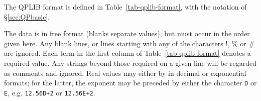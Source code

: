 
The QPLIB format is defined in Table~\ref{tab-qplib-format}, with the notation of \S\ref{sec:QPbasic}.

The data is in free format (blanks separate values), but must occur in
the order given here. Any blank lines, or lines starting with any of the
characters !, \% or \# are ignored. Each term in the first column of
Table~\ref{tab-qplib-format} denotes a required value. Any strings beyond
those required on a given line will be regarded as comments and ignored.
Real values may either by in decimal or exponential formats; for the latter,
the exponent may be preceded by either the character \texttt{D} or \texttt{E},
e.g. \texttt{12.56D+2} or \texttt{12.56E+2}.

